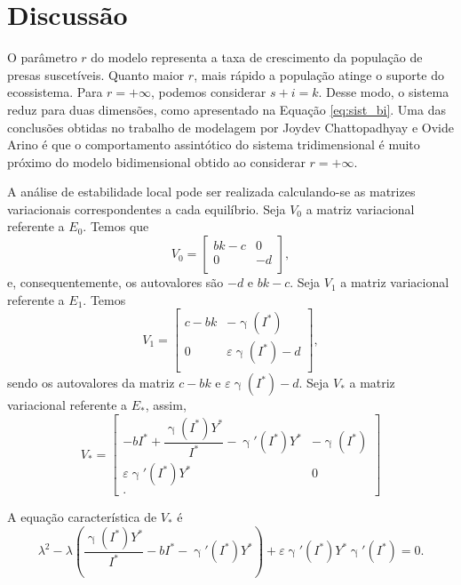 \documentclass{article}
\begin{document}
\section{Discussão}
O parâmetro $r$ do modelo representa a taxa de crescimento da população de presas suscetíveis. Quanto maior $r$, mais rápido a população atinge o suporte do ecossistema. Para $r = + \infty$, podemos considerar $s + i = k$. Desse modo, o sistema reduz para duas dimensões, como apresentado na Equação \ref{eq:sist_bi}. Uma das conclusões obtidas no trabalho de modelagem por Joydev Chattopadhyay e Ovide Arino \cite{chattopadhyay} é que o comportamento assintótico do sistema tridimensional é muito próximo do modelo bidimensional obtido ao considerar $r = + \infty$.

A análise de estabilidade local pode ser realizada calculando-se as matrizes variacionais correspondentes a cada equilíbrio. Seja $V_0$ a matriz variacional referente a $E_0$. Temos que  
\begin{equation*}
    V_0 = 
    \begin{bmatrix}
        bk - c & 0 \\
        0 & -d \\
    \end{bmatrix},
\end{equation*}
e, consequentemente, os autovalores são $-d$ e $bk - c$. Seja $V_1$ a matriz variacional referente a $E_1$. Temos 
\begin{equation*}
    V_1 = 
    \begin{bmatrix}
        c - bk & - \upgamma(I^*) \\ 
        0 & \varepsilon \upgamma(I^*) - d \\
    \end{bmatrix},
\end{equation*}
sendo os autovalores da matriz $c-bk$ e $\varepsilon \upgamma(I^*) - d$. Seja $V_*$ a matriz variacional referente a $E_*$, assim,
\begin{equation*}
    V_* =
    \begin{bmatrix}
        - b I^* + \dfrac{\upgamma(I^*)Y^*}{I^*} - \upgamma'(I^*) Y^* & -\upgamma(I^*) \\
        \varepsilon \upgamma'(I^*)Y^* & 0 \\.
    \end{bmatrix}
\end{equation*}

A equação característica de $V_*$ é 
\begin{equation*}
    \lambda^2 - \lambda \left( \dfrac{\upgamma(I^*)Y^*}{I^*} - b I^* -  \upgamma'(I^*) Y^* \right) + \varepsilon \upgamma'(I^*)Y^*\upgamma'(I^*) = 0.
\end{equation*}
\end{document}
